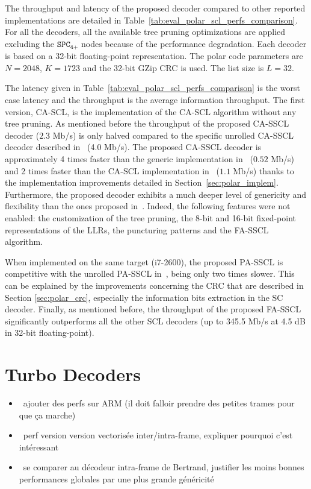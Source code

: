 The throughput and latency of the proposed decoder compared to other reported
implementations are detailed in Table~\ref{tab:eval_polar_scl_perfs_comparison}.
For all the decoders, all the available tree pruning optimizations are applied
excluding the $\texttt{SPC}_\texttt{4+}$ nodes because of the performance
degradation. Each decoder is based on a 32-bit floating-point representation.
The polar code parameters are $N=2048$, $K=1723$ and the 32-bit GZip CRC is
used. The list size is $L=32$.

The latency given in Table~\ref{tab:eval_polar_scl_perfs_comparison} is the
worst case latency and the throughput is the average information throughput. The
first version, CA-SCL, is the implementation of the CA-SCL algorithm without any
tree pruning. As mentioned before the throughput of the proposed CA-SSCL decoder
($2.3$ Mb/s) is only halved compared to the specific unrolled CA-SSCL decoder
described in~\cite{Sarkis2016} (4.0 Mb/s). The proposed CA-SSCL decoder is
approximately 4 times faster than the generic implementation
in~\cite{Sarkis2014b} ($0.52$ Mb/s) and 2 times faster than the CA-SCL
implementation in~\cite{Shen2016} ($1.1$ Mb/s) thanks to the implementation
improvements detailed in Section~\ref{sec:polar_implem}. Furthermore, the
proposed decoder exhibits a much deeper level of genericity and flexibility than
the ones proposed in~\cite{Sarkis2014,Shen2016}. Indeed, the following features
were not enabled: the customization of the tree pruning, the 8-bit and 16-bit
fixed-point representations of the LLRs, the puncturing patterns and the FA-SSCL
algorithm.

When implemented on the same target (i7-2600), the proposed PA-SSCL is
competitive with the unrolled PA-SSCL in~\cite{Sarkis2016}, being only two times
slower. This can be explained by the improvements concerning the CRC that are
described in Section \ref{sec:polar_crc}, especially the information bits
extraction in the SC decoder. Finally, as mentioned before, the throughput of
the proposed FA-SSCL significantly outperforms all the other SCL decoders (up to
345.5 Mb/s at 4.5 dB in 32-bit floating-point).

\section{Turbo Decoders}
\label{sec:eval_turbo}

\begin{itemize}
  \item \xmark~ajouter des perfs sur ARM (il doit falloir prendre des petites
    trames pour que ça marche)
  \item \xmark~perf version version vectorisée inter/intra-frame, expliquer
    pourquoi c'est intéressant
  \item \xmark~se comparer au décodeur intra-frame de Bertrand, justifier les
    moins bonnes performances globales par une plus grande généricité
\end{itemize}

